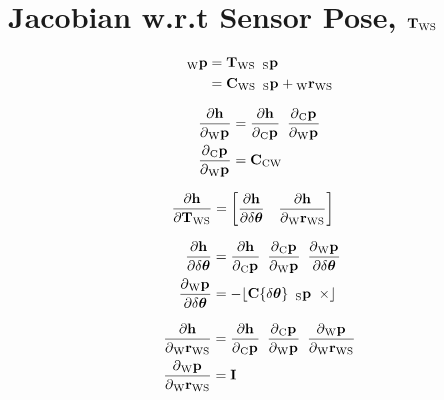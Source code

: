 \section{Jacobian w.r.t Sensor Pose, $\Tf{\world}{\sensor}$}

\begin{align}
  \Point{\world}{\fiducial_{ij}}
  &=
    \Tf{\world}{\sensor}
    \enspace \Pt{\sensor} \\
  &=
    \Rot{\world}{\sensor}
    \enspace \Pt{\sensor}
		+ \Pos{\world}{\sensor}
\end{align}

\begin{align}
  \dfrac{\partial{\projFunc}}{\partial{\Pt{\world}}}
		&= \dfrac{\partial{\projFunc}}{\partial{\Pt{\cam}}}
			 \enspace
			 \dfrac{\partial{\Pt{\cam}}}{\partial{\Pt{\world}}} \\
  \dfrac{\partial{\Pt{\cam}}}{\partial{\Pt{\world}}}
		&= \Rot{\cam}{\world}
\end{align}

\begin{align}
  \dfrac{\partial{\projFunc}}{\partial{\Tf{\world}{\sensor}}}
    &=
		\begin{bmatrix}
			\dfrac{\partial{\projFunc}}{\partial{\dtheta}}
			\quad
			\dfrac{\partial{\projFunc}}{\partial{\Pos{\world}{\sensor}}}
		\end{bmatrix}
\end{align}

\begin{align}
  \dfrac{\partial{\projFunc}}{\partial{\dtheta}}
    &= \dfrac{\partial{\projFunc}}{\partial{\Pt{\cam}}}
			 \enspace
       \dfrac{\partial{\Pt{\cam}}}{\partial{\Pt{\world}}}
			 \enspace
       \dfrac{\partial{\Pt{\world}}}{\partial{\dtheta}} \\
	\dfrac{\partial{\Pt{\world}}}{\partial{\dtheta}}
    &= -\Skew{\rot\{\dtheta\} \enspace \Pt{\sensor}}
\end{align}

\begin{align}
  \dfrac{\partial{\projFunc}}{\partial{\Pos{\world}{\sensor}}}
    &= \dfrac{\partial{\projFunc}}{\partial{\Pt{\cam}}}
			 \enspace
       \dfrac{\partial{\Pt{\cam}}}{\partial{\Pt{\world}}}
			 \enspace
       \dfrac{\partial{\Pt{\world}}}{\partial{\Pos{\world}{\sensor}}} \\
	\dfrac{\partial{\Pt{\world}}}{\partial{\Pos{\world}{\sensor}}}
		&= \I
\end{align}


